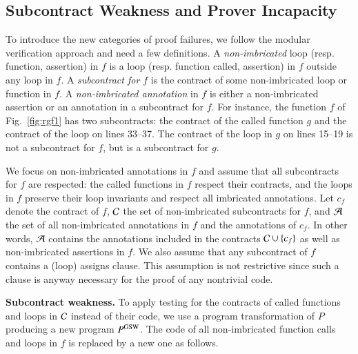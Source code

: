 \subsection{Subcontract Weakness and Prover Incapacity}
\label{subsec:SW}

To introduce the new categories of proof failures, we follow
the modular verification approach and need a few definitions.
A \emph{non-imbricated} loop (resp. function, assertion) in $f$ is a loop
 (resp. function called, assertion) in $f$ outside any loop in
$f$. A \emph{subcontract for $f$} is the contract of some non-imbricated loop or function
 in $f$. A \emph{non-imbricated annotation} in $f$ is either a
non-imbricated assertion or an annotation in a subcontract for $f$.
For instance, the function $f$ of Fig.~\ref{fig:rgf1} has two subcontracts:
the contract of the called function $g$ and the contract of the loop on lines 33--37.
The contract of the loop in $g$ on lines 15--19 is not a subcontract for $f$, but is a subcontract for $g$.

We focus on non-imbricated annotations in $f$ and assume  that all subcontracts for $f$ are respected:
the called functions in $f$ respect their contracts, and the loops in $f$  preserve their loop invariants
and respect all imbricated annotations.
Let $c_f$ denote the contract of $f$,
${\mathcal{C}}$ the set of non-imbricated subcontracts for $f$,
and ${\mathcal{A}}$ the set of all non-imbricated annotations in $f$ and the annotations of $c_f$.
In other words, ${\mathcal{A}}$ contains  
the annotations included in the contracts ${\mathcal{C}}\cup\{c_f\}$ as well as non-imbricated  assertions in $f$.
We also assume that any subcontract of $f$ contains a (loop) assigns clause.
This assumption is not restrictive since such a clause is anyway necessary 
for the proof of any nontrivial code.



\textbf{Subcontract weakness.}
To apply testing for  the contracts of called functions and loops in ${\mathcal{C}}$
instead of their code,
we use a program transformation of $P$ producing a new program $P^{\mathrm{GSW}}$.
The code of all non-imbricated function calls and loops in $f$
is replaced by a new one as follows.

